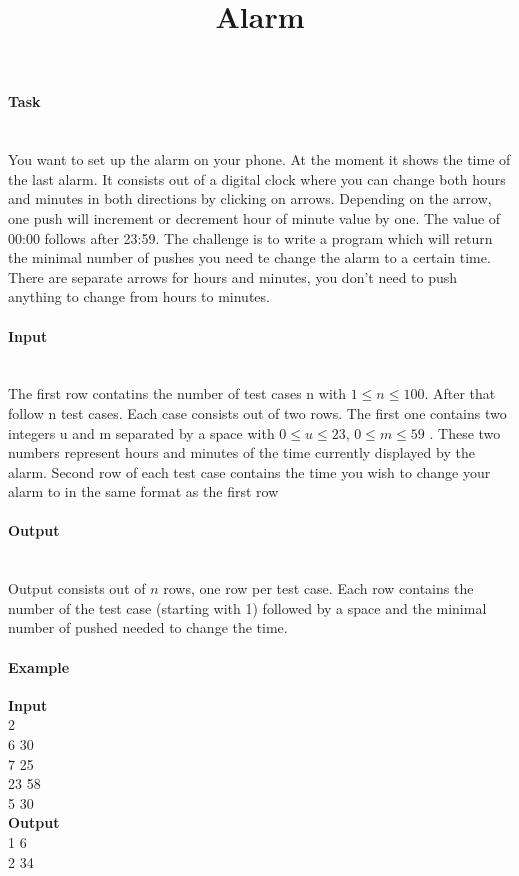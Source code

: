\documentclass[10pt,a4paper]{article}
\begin{document}
\title{Alarm}
\maketitle

\paragraph{Task\\ \\}

You want to set up the alarm on your phone. At the moment it shows the time of the last alarm. It consists out of a digital clock where you can change both hours and minutes in both directions by clicking on arrows. Depending on the arrow, one push will increment or decrement hour of minute value by one. The value of 00:00 follows after 23:59. The challenge is to write a program which will return the minimal number of pushes you need te change the alarm to a certain time. There are separate arrows for hours and minutes, you don't need to push anything to change from hours to minutes.

\paragraph{Input\\ \\}
The first row contatins the number of test cases n with $1 \leq n \leq 100$. After that follow n test cases. Each case consists out of two rows. The first one contains two integers u and m separated by a space with $0 \leq u \leq 23$, $0 \leq m \leq 59$ . These two numbers represent hours and minutes of the time currently displayed by the alarm. Second row of each test case contains the time you wish to change your alarm to in the same format as the first row


\paragraph{Output\\ \\}

Output consists out of $n$ rows, one row per test case. Each row contains the number of the test case (starting with 1) followed by a space and the minimal number of pushed needed to change the time.

\paragraph{Example \\}
\textbf{Input \\}
2 \\
6 30 \\
7 25 \\
23 58 \\
5 30\\

\textbf{Output \\}
1 6\\
2 34
\end{document}

